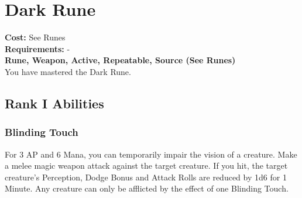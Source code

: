 \section{Dark Rune}\label{rune:dark}
\textbf{Cost:} See Runes\\
\textbf{Requirements:} -\\
\textbf{Rune, Weapon, Active, Repeatable, Source (See Runes)}\\
You have mastered the Dark Rune.

\subsection{Rank I Abilities}

\subsubsection{Blinding Touch}
For 3 AP and 6 Mana, you can temporarily impair the vision of a creature.
Make a melee magic weapon attack against the target creature.
If you hit, the target creature's Perception, Dodge Bonus and Attack Rolls are reduced by 1d6 for 1 Minute.
Any creature can only be afflicted by the effect of one Blinding Touch.
